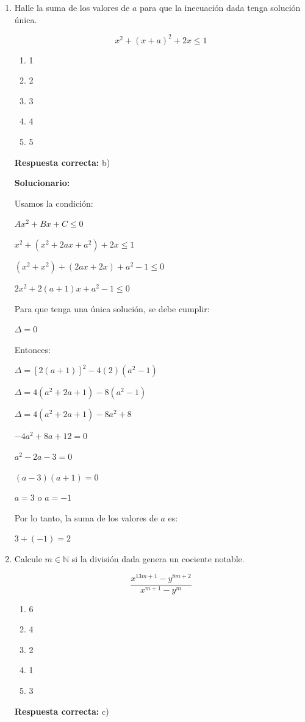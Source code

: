 \begin{enumerate}[resume]
	
	\item Halle la suma de los valores de $a$ para que la inecuación dada tenga solución única.
	
	$$x^2+(x+a)^2+2x\leq 1$$
	
	\begin{enumerate}[label=\alph*)]
		\item 1
		\item 2
		\item 3
		\item 4
		\item 5
	\end{enumerate}
	\textbf{Respuesta correcta:} b)
	
	\vspace{2mm}
	\textbf{Solucionario:}
	
	
	
	Usamos la condición:
	
	$Ax^2+Bx+C \leq 0$
	
	$x^2+(x^2+2ax+a^2)+2x \leq 1$

	$(x^2+x^2)+(2ax+2x)+a^2-1 \leq 0$
	
	$2x^2+2(a+1)x+a^2-1 \leq 0$
	
	Para que tenga una única solución, se debe cumplir:
	
	$\Delta = 0$
	
	Entonces:
	
	$\Delta = [2(a+1)]^2 - 4(2)(a^2-1)$
	
	$\Delta = 4(a^2+2a+1)-8(a^2-1)$
	
	$\Delta = 4(a^2+2a+1)-8a^2+8$
	
	$-4a^2+8a+12=0$
	
	$a^2-2a-3=0$
	
	$(a-3)(a+1)=0$
	
	$a=3$ o $a=-1$
	
	Por lo tanto, la suma de los valores de $a$ es:
	
	$3+(-1)=\boxed{2}$
	
	
	\vspace{6mm}
	
	\item Calcule $m\in \mathbb{N}$ si la división dada genera un cociente notable.
	
	$$\dfrac{x^{13m+1}-y^{8m+2}}{x^{m+1}-y^m}$$
	
	\begin{enumerate}[label=\alph*)]
		\item 6
		\item 4
		\item 2
		\item 1
		\item 3
	\end{enumerate}
	\textbf{Respuesta correcta:} c)
	

\end{enumerate}
